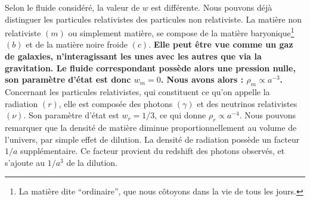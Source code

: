 \documentclass[11pt, twoside, a4paper, openright]{report}
\begin{document}
Selon le fluide considéré, la valeur de $w$ est différente. Nous pouvons déjà distinguer les particules relativistes des particules non relativiste. La matière non relativiste $(m)$ ou simplement matière, se compose de la matière baryonique\footnote{La matière dite ``ordinaire'', que nous côtoyons dans la vie de tous les jours.} $(b)$ et de la matière noire froide $(c)$.
\textbf{Elle peut être vue comme un gaz de galaxies, n'interagissant les unes avec les autres que via la gravitation. Le fluide correspondant possède alors une pression nulle, son paramètre d'état est donc $w_m = 0$. Nous avons alors : $\rho_m \propto a^{-3}$. \\}
Concernant les particules relativistes, qui constituent ce qu'on appelle la radiation $(r)$, elle est composée des photons $(\gamma)$ et des neutrinos relativistes $(\nu)$. Son paramètre d'état est $w_r = 1/3$, ce qui donne $\rho_r \propto a^{-4}$. Nous pouvons remarquer que la densité de matière diminue proportionnellement au volume de l'univers, par simple effet de dilution. La densité de radiation possède un facteur $1/a$ supplémentaire. Ce facteur provient du redshift des photons observés, et s'ajoute au $1/a^3$ de la dilution.
\end{document}
